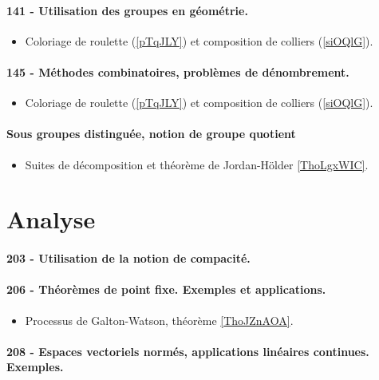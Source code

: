 \paragraph{141 - Utilisation des groupes en géométrie.}
\begin{itemize}
    \item Coloriage de roulette (\ref{pTqJLY}) et composition de colliers (\ref{siOQlG}).
\end{itemize}
\paragraph{145 - Méthodes combinatoires, problèmes de dénombrement.}
\begin{itemize}
    \item Coloriage de roulette (\ref{pTqJLY}) et composition de colliers (\ref{siOQlG}).
\end{itemize}
\paragraph{Sous groupes distinguée, notion de groupe quotient}
\begin{itemize}
    \item Suites de décomposition et théorème de Jordan-Hölder \ref{ThoLgxWIC}.
\end{itemize}

\section{Analyse}

\paragraph{203 - Utilisation de la notion de compacité.}
\paragraph{206 - Théorèmes de point fixe. Exemples et applications.}
\begin{itemize}
    \item Processus de Galton-Watson, théorème \ref{ThoJZnAOA}.
\end{itemize}
\paragraph{208 - Espaces vectoriels normés, applications linéaires continues. Exemples.}
